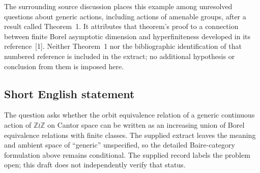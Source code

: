 \documentclass[11pt]{article}
\newcommand{\Z}{\mathbb{Z}}
\begin{document}
The surrounding source discussion places this example among unresolved questions about generic actions, including actions of amenable groups, after a result called Theorem~1. It attributes that theorem's proof to a connection between finite Borel asymptotic dimension and hyperfiniteness developed in its reference~[1]. Neither Theorem~1 nor the bibliographic identification of that numbered reference is included in the extract; no additional hypothesis or conclusion from them is imposed here.
\subsection{Short English statement}
The question asks whether the orbit equivalence relation of a generic continuous action of \(\Z\wr\Z\) on Cantor space can be written as an increasing union of Borel equivalence relations with finite classes. The supplied extract leaves the meaning and ambient space of ``generic'' unspecified, so the detailed Baire-category formulation above remains conditional. The supplied record labels the problem open; this draft does not independently verify that status.
\end{document}

